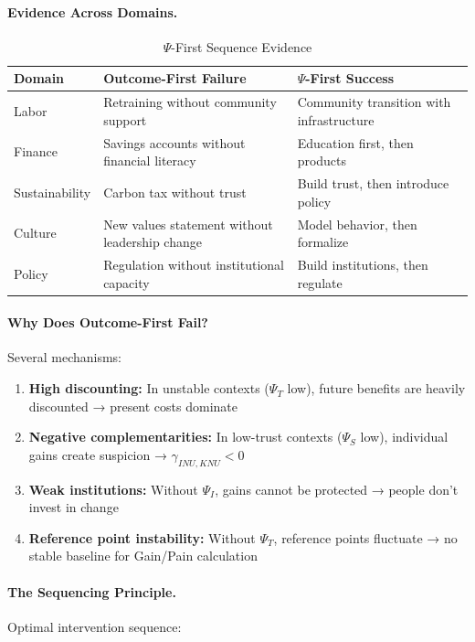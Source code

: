 \paragraph{Evidence Across Domains.}

\begin{table}[htbp]
\centering
\caption{$\Psi$-First Sequence Evidence}
\label{tab:psi-first-evidence}
\renewcommand{\arraystretch}{1.3}
\begin{tabular}{@{}lp{5cm}p{5cm}@{}}
\toprule
\textbf{Domain} & \textbf{Outcome-First Failure} & \textbf{$\Psi$-First Success} \\
\midrule
Labor & Retraining without community support & Community transition with infrastructure \\
Finance & Savings accounts without financial literacy & Education first, then products \\
Sustainability & Carbon tax without trust & Build trust, then introduce policy \\
Culture & New values statement without leadership change & Model behavior, then formalize \\
Policy & Regulation without institutional capacity & Build institutions, then regulate \\
\bottomrule
\end{tabular}
\end{table}

\paragraph{Why Does Outcome-First Fail?}
Several mechanisms:

\begin{enumerate}
\item \textbf{High discounting:} In unstable contexts ($\Psi_T$ low), future 
benefits are heavily discounted → present costs dominate
\item \textbf{Negative complementarities:} In low-trust contexts ($\Psi_S$ low), 
individual gains create suspicion → $\gamma_{INU,KNU} < 0$
\item \textbf{Weak institutions:} Without $\Psi_I$, gains cannot be protected → 
people don't invest in change
\item \textbf{Reference point instability:} Without $\Psi_T$, reference points 
fluctuate → no stable baseline for Gain/Pain calculation
\end{enumerate}

\paragraph{The Sequencing Principle.}
Optimal intervention sequence:

